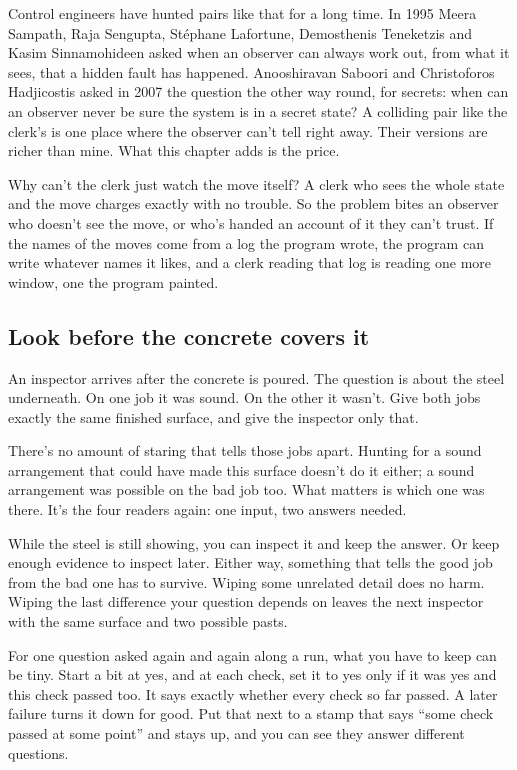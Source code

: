 \documentclass[11pt,twoside]{article}
\theoremstyle{thielethm}
\theoremstyle{thieledef}
\theoremstyle{thieledef}
\theoremstyle{thieledef}
\theoremstyle{thielethm}
\theoremstyle{thieleobs}
\theoremstyle{thielethm}
\begin{document}
Control engineers have hunted pairs like that for a long time. In 1995 Meera Sampath, Raja Sengupta, Stéphane Lafortune, Demosthenis Teneketzis and Kasim Sinnamohideen asked when an observer can always work out, from what it sees, that a hidden fault has happened. Anooshiravan Saboori and Christoforos Hadjicostis asked in 2007 the question the other way round, for secrets: when can an observer never be sure the system is in a secret state? A colliding pair like the clerk's is one place where the observer can't tell right away. Their versions are richer than mine. What this chapter adds is the price.

Why can't the clerk just watch the move itself? A clerk who sees the whole state and the move charges exactly with no trouble. So the problem bites an observer who doesn't see the move, or who's handed an account of it they can't trust. If the names of the moves come from a log the program wrote, the program can write whatever names it likes, and a clerk reading that log is reading one more window, one the program painted.

\subsection{Look before the concrete covers it}

An inspector arrives after the concrete is poured. The question is about the steel underneath. On one job it was sound. On the other it wasn't. Give both jobs exactly the same finished surface, and give the inspector only that.

There's no amount of staring that tells those jobs apart. Hunting for a sound arrangement that could have made this surface doesn't do it either; a sound arrangement was possible on the bad job too. What matters is which one was there. It's the four readers again: one input, two answers needed.

While the steel is still showing, you can inspect it and keep the answer. Or keep enough evidence to inspect later. Either way, something that tells the good job from the bad one has to survive. Wiping some unrelated detail does no harm. Wiping the last difference your question depends on leaves the next inspector with the same surface and two possible pasts.

For one question asked again and again along a run, what you have to keep can be tiny. Start a bit at yes, and at each check, set it to yes only if it was yes and this check passed too. It says exactly whether every check so far passed. A later failure turns it down for good. Put that next to a stamp that says ``some check passed at some point'' and stays up, and you can see they answer different questions.
\end{document}
